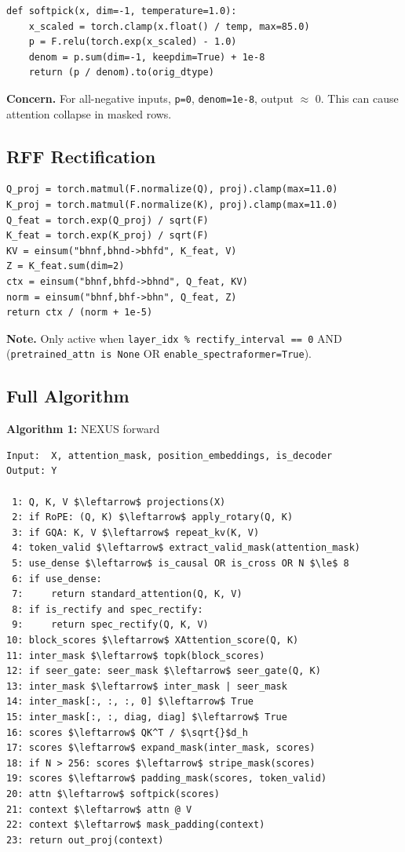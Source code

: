 \begin{lstlisting}
def softpick(x, dim=-1, temperature=1.0):
    x_scaled = torch.clamp(x.float() / temp, max=85.0)
    p = F.relu(torch.exp(x_scaled) - 1.0)
    denom = p.sum(dim=-1, keepdim=True) + 1e-8
    return (p / denom).to(orig_dtype)
\end{lstlisting}

\textbf{Concern.} For all-negative inputs, \texttt{p=0}, \texttt{denom=1e-8}, output $\approx$ 0. 
This can cause attention collapse in masked rows.

\subsection{RFF Rectification}

\begin{lstlisting}
Q_proj = torch.matmul(F.normalize(Q), proj).clamp(max=11.0)
K_proj = torch.matmul(F.normalize(K), proj).clamp(max=11.0)
Q_feat = torch.exp(Q_proj) / sqrt(F)
K_feat = torch.exp(K_proj) / sqrt(F)
KV = einsum("bhnf,bhnd->bhfd", K_feat, V)
Z = K_feat.sum(dim=2)
ctx = einsum("bhnf,bhfd->bhnd", Q_feat, KV)
norm = einsum("bhnf,bhf->bhn", Q_feat, Z)
return ctx / (norm + 1e-5)
\end{lstlisting}

\textbf{Note.} Only active when \texttt{layer\_idx \% rectify\_interval == 0} AND (\texttt{pretrained\_attn is None} OR \texttt{enable\_spectraformer=True}).

\subsection{Full Algorithm}

\textbf{Algorithm 1:} NEXUS forward
\begin{lstlisting}
Input:  X, attention_mask, position_embeddings, is_decoder
Output: Y

 1: Q, K, V $\leftarrow$ projections(X)
 2: if RoPE: (Q, K) $\leftarrow$ apply_rotary(Q, K)
 3: if GQA: K, V $\leftarrow$ repeat_kv(K, V)
 4: token_valid $\leftarrow$ extract_valid_mask(attention_mask)
 5: use_dense $\leftarrow$ is_causal OR is_cross OR N $\le$ 8
 6: if use_dense:
 7:     return standard_attention(Q, K, V)
 8: if is_rectify and spec_rectify:
 9:     return spec_rectify(Q, K, V)
10: block_scores $\leftarrow$ XAttention_score(Q, K)
11: inter_mask $\leftarrow$ topk(block_scores)
12: if seer_gate: seer_mask $\leftarrow$ seer_gate(Q, K)
13: inter_mask $\leftarrow$ inter_mask | seer_mask
14: inter_mask[:, :, :, 0] $\leftarrow$ True
15: inter_mask[:, :, diag, diag] $\leftarrow$ True
16: scores $\leftarrow$ QK^T / $\sqrt{}$d_h
17: scores $\leftarrow$ expand_mask(inter_mask, scores)
18: if N > 256: scores $\leftarrow$ stripe_mask(scores)
19: scores $\leftarrow$ padding_mask(scores, token_valid)
20: attn $\leftarrow$ softpick(scores)
21: context $\leftarrow$ attn @ V
22: context $\leftarrow$ mask_padding(context)
23: return out_proj(context)
\end{lstlisting}

